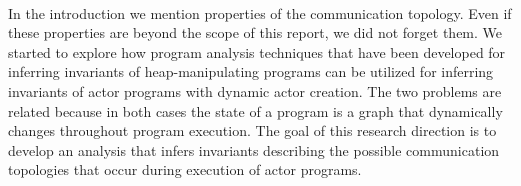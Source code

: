 \documentclass[a4paper]{report}
\numberwithin{algorithm}{chapter}
\begin{document}
\paragraph{}
In the introduction we mention properties of the communication topology.
Even if these properties are beyond the scope of this report, we did not forget them.
We started to explore how program analysis techniques that have been developed for inferring invariants of heap-manipulating programs can be utilized for inferring invariants of actor programs with dynamic actor creation.
The two problems are related because in both cases the state of a program is a graph that dynamically changes throughout program execution.
The goal of this research direction is to develop an analysis that infers invariants describing the possible communication topologies that occur during execution of actor programs.




\end{document}
